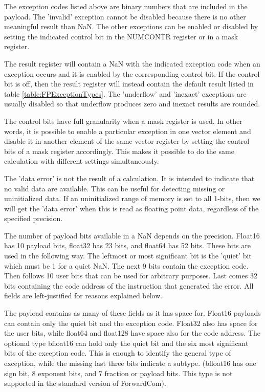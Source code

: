 \documentclass[forwardcom.tex]{subfiles}
\begin{document}
The exception codes listed above are binary numbers that are included in the payload. The 'invalid' exception cannot be disabled because there is no other meaningful result than NaN. The other exceptions can be enabled or disabled by setting the indicated control bit in the NUMCONTR register or in a mask register.
\vv

The result register will contain a NaN with the indicated exception code when an exception occurs and it is enabled by the corresponding control bit. If the control bit is off, then the result register will instead contain the default result listed in table \ref{table:FPExceptionTypes}. The 'underflow' and 'inexact' exceptions are usually disabled so that underflow produces zero and inexact results are rounded.
\vv

The control bits have full granularity when a mask register is used. In other words, it is possible to enable a particular exception in one vector element and disable it in another element of the same vector register by setting the control bits of a mask register accordingly. This makes it possible to do the same calculation with different settings simultaneously.
\vv

The 'data error' is not the result of a calculation. It is intended to indicate that no valid data are available. This can be useful for detecting missing or uninitialized data. If an uninitialized range of memory is set to all 1-bits, then we will get the 'data error' when this is read as floating point data, regardless of the specified precision.
\vv

The number of payload bits available in a NaN depends on the precision. Float16 has 10 payload bits, float32 has 23 bits, and float64 has 52 bits. These bits are used in the following way. The leftmost or most significant bit is the 'quiet' bit which must be 1 for a quiet NaN. The next 9 bits contain the exception code. Then follows 10 user bits that can be used for arbitrary purposes. Last comes 32 bits containing the code address of the instruction that generated the error. All fields are left-justified for reasons explained below.
\vv

The payload contains as many of these fields as it has space for. Float16 payloads can contain only the quiet bit and the exception code. Float32 also has space for the user bits, while float64 and float128 have space also for the code address. The optional type bfloat16 can hold only the quiet bit and the six most significant bits of the exception code. This is enough to identify the general type of exception, while the missing last three bits indicate a subtype. (bfloat16 has one sign bit, 8 exponent bits, and 7 fraction or payload bits. This type is not supported in the standard version of ForwardCom).
\vv
\end{document}
